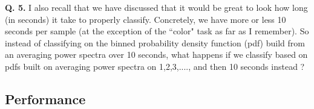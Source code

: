 {\bf Q. 5.} I also recall that we have discussed that it would be great to look how long (in seconds) it take to properly classify. Concretely, we have more or less 10 seconds per sample (at the exception of the ``color" task as far as I remember). So instead of classifying on the binned probability density function (pdf) build from an averaging power spectra over 10 seconds, what happens if we classify based on pdfs built on averaging power spectra on 1,2,3,...., and then 10 seconds instead ?




\subsection{Performance}



